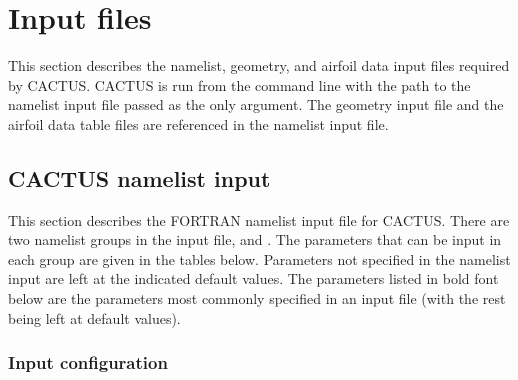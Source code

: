 \chapter{Input files}
This section describes the namelist, geometry, and airfoil data input files required by CACTUS. CACTUS is run from the command line with the path to the namelist input file passed as the only argument. The geometry input file and the airfoil data table files are referenced in the namelist input file.

\section{CACTUS namelist input}
This section describes the FORTRAN namelist input file for CACTUS. There are two namelist groups in the input file,  and . The parameters that can be input in each group are given in the tables below. Parameters not specified in the namelist input are left at the indicated default values. The parameters listed in bold font below are the parameters most commonly specified in an input file (with the rest being left at default values). 
\subsection{Input configuration}

